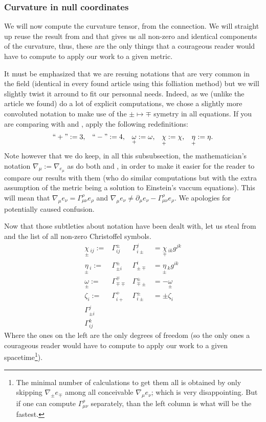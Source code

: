 \documentclass[a4paper,11pt]{article}
\numberwithin{equation}{section}
\theoremstyle{definition}
\begin{document}
\subsubsection{Curvature in null coordinates}
We will now compute the curvature tensor, from the connection. We will straight up reuse the result from \cite{Art} and \cite{Chris} that gives us all non-zero and identical components of the curvature, thus, these are the only things that a courageous reader would have to compute to apply our work to a given metric.

It must be emphasized that we are resuing notations that are very common in the field (identical in every found article using this folliation method) but we will slightly twist it arround to fit our personnal needs. Indeed, as we (unlike the article we found) do a lot of explicit computations, we chose a slightly more convoluted notation to make use of the $\pm\mapsto\mp$ symetry in all equations. If you are comparing with \cite{Art} and \cite{Chris}, apply the following redefinitions:
\begin{align*}
    ``+":=3, && ``-":=4, && \underset{+}{\omega}:=\omega, && \underset{+}{\chi}:=\chi, && \underset{+}{\eta}:=\eta.
\end{align*}
Note however that we do keep, in all this subsubsection, the mathematician's notation $\nabla_\mu:=\nabla_{e_\mu}$ as do both \cite{Art} and \cite{Chris}, in order to make it easier for the reader to compare our results with them (who do similar computations but with the extra assumption of the metric being a solution to Einstein's vaccum equations). This will mean that $\nabla_\mu e_\nu = \Gamma_{\mu\nu}^\rho e_\rho$ and $\nabla_\mu e_\nu \ne \partial_\mu e_\nu - \Gamma_{\mu\nu}^\rho e_\rho$. We apologies for potentially caused confusion.

Now that those subtleties about notation have been dealt with, let us steal from \cite{Art} and \cite{Chris} the list of all non-zero Christoffel symbols.
\begin{align*}
    \underset{\pm}{\chi}\,_{ij} :=&\Gamma_{ij}^\pm &\Gamma_{i\pm}^j&=\underset{\mp}{\chi}\,_{ik}g^{jk}\\
    \underset{\pm}{\eta}\,_i :=&\Gamma_{\pm i}^\pm &\Gamma_{\pm\mp}^i&=\underset{\pm}{\eta}\,_kg^{ik}\\
    \underset{\pm}{\omega}:=&\Gamma_{\mp\mp}^\mp &\Gamma_{\mp\pm}^\pm&=-\underset{\pm}{\omega}\\
    \zeta_i :=& \Gamma_{i+}^+ &\Gamma_{i\pm}^\pm&=\pm\zeta_i \\
    \Gamma_{\pm i}^j&\\
    \Gamma_{ij}^k&
\end{align*}
Where the ones on the left are the only degrees of freedom (so the only ones a courageous reader would have to compute to apply our work to a given spacetime\footnote{The minimal number of calculations to get them all is obtained by only skipping $\nabla_\pm e_\mp$ among all conceivable $\nabla_\mu e_\nu$; which is very disappointing. But if one can compute $\Gamma_{\mu\nu}^\rho$ separately, than the left column is what will be the fastest.}).
\end{document}

